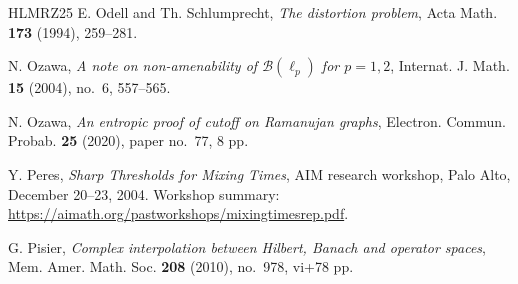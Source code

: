 \documentclass[11pt,reqno]{amsart}
\theoremstyle{definition}
\begin{document}
\begin{thebibliography}{HLMRZ25}
E. Odell and Th. Schlumprecht,
\emph{The distortion problem},
Acta Math. \textbf{173} (1994), 259--281.

N. Ozawa,
\emph{A note on non-amenability of $\mathcal B(\ell_p)$ for $p=1,2$},
Internat. J. Math. \textbf{15} (2004), no.~6, 557--565.

N. Ozawa,
\emph{An entropic proof of cutoff on Ramanujan graphs},
Electron. Commun. Probab. \textbf{25} (2020), paper no.~77, 8 pp.

Y. Peres,
\emph{Sharp Thresholds for Mixing Times},
AIM research workshop, Palo Alto, December 20--23, 2004.
Workshop summary: \url{https://aimath.org/pastworkshops/mixingtimesrep.pdf}.

G. Pisier,
\emph{Complex interpolation between Hilbert, Banach and operator spaces},
Mem. Amer. Math. Soc. \textbf{208} (2010), no.~978, vi+78 pp.

\end{thebibliography}
\end{document}
